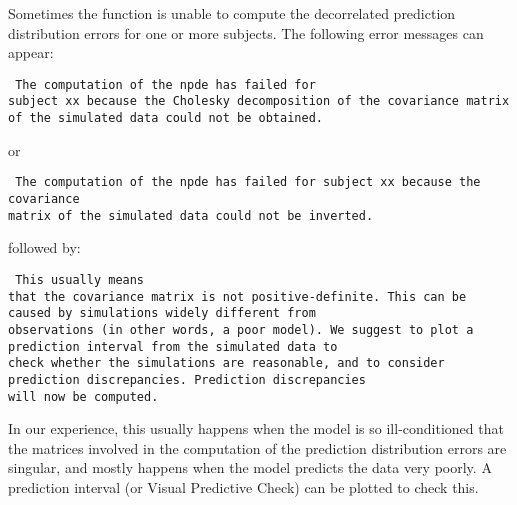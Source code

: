 \hskip 18pt Sometimes the function is unable to compute the decorrelated prediction distribution errors for one or 
more subjects. The following error messages can appear: \begin{verbatim} The computation of the npde has failed for 
subject xx because the Cholesky decomposition of the covariance matrix of the simulated data could not be obtained. 
\end{verbatim} or \begin{verbatim} The computation of the npde has failed for subject xx because the covariance 
matrix of the simulated data could not be inverted. \end{verbatim} followed by: \begin{verbatim} This usually means 
that the covariance matrix is not positive-definite. This can be caused by simulations widely different from 
observations (in other words, a poor model). We suggest to plot a prediction interval from the simulated data to 
check whether the simulations are reasonable, and to consider prediction discrepancies. Prediction discrepancies 
will now be computed. \end{verbatim} In our experience, this usually happens when the model is so ill-conditioned 
that the matrices involved in the computation of the prediction distribution errors are singular, and mostly 
happens when the model predicts the data very poorly. A prediction interval (or Visual Predictive Check) can be 
plotted to check this.

